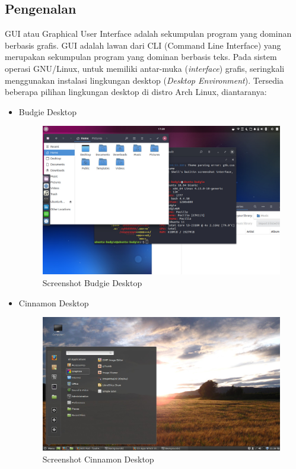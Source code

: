 \documentclass[12pt,]{article}
\begin{document}
	\subsection{Pengenalan}
	GUI atau Graphical User Interface adalah sekumpulan program yang dominan berbasis grafis.
	GUI adalah lawan dari CLI (Command Line Interface) yang merupakan sekumpulan program yang dominan berbasis teks.
	Pada sistem operasi GNU/Linux, untuk memiliki antar-muka (\textit{interface}) grafis,
	seringkali menggunakan instalasi lingkungan desktop (\textit{Desktop Environment}).
	Tersedia beberapa pilihan lingkungan desktop di distro Arch Linux, diantaranya:
	\begin{itemize}
		\item Budgie Desktop
		\begin{figure}[H]
			\centering
			\includegraphics[width=0.8\linewidth]{images/vbox_de/budgie}
			\caption{Screenshot Budgie Desktop}
		\end{figure}

		\item Cinnamon Desktop
		\begin{figure}[H]
			\centering
			\includegraphics[width=0.8\linewidth]{images/vbox_de/cinnamon}
			\caption{Screenshot Cinnamon Desktop}
		\end{figure}


\end{itemize}
\end{document}
